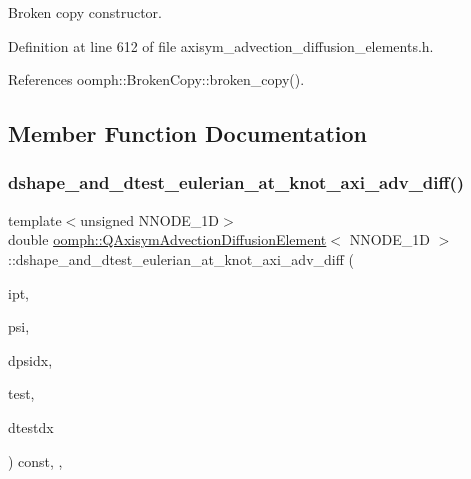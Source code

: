 Broken copy constructor. 



Definition at line 612 of file axisym\+\_\+advection\+\_\+diffusion\+\_\+elements.\+h.



References oomph\+::\+Broken\+Copy\+::broken\+\_\+copy().



\subsection{Member Function Documentation}
\mbox{\label{classoomph_1_1QAxisymAdvectionDiffusionElement_a4bb026009c2c69e6870ff45450382418}} 
\subsubsection{\texorpdfstring{dshape\+\_\+and\+\_\+dtest\+\_\+eulerian\+\_\+at\+\_\+knot\+\_\+axi\+\_\+adv\+\_\+diff()}{dshape\_and\_dtest\_eulerian\_at\_knot\_axi\_adv\_diff()}}
{\footnotesize\ttfamily template$<$unsigned N\+N\+O\+D\+E\+\_\+1D$>$ \\
double \hyperlink{classoomph_1_1QAxisymAdvectionDiffusionElement}{oomph\+::\+Q\+Axisym\+Advection\+Diffusion\+Element}$<$ N\+N\+O\+D\+E\+\_\+1D $>$\+::dshape\+\_\+and\+\_\+dtest\+\_\+eulerian\+\_\+at\+\_\+knot\+\_\+axi\+\_\+adv\+\_\+diff (\begin{DoxyParamCaption}\item[{const unsigned \&}]{ipt,  }\item[{\hyperlink{classoomph_1_1Shape}{Shape} \&}]{psi,  }\item[{\hyperlink{classoomph_1_1DShape}{D\+Shape} \&}]{dpsidx,  }\item[{\hyperlink{classoomph_1_1Shape}{Shape} \&}]{test,  }\item[{\hyperlink{classoomph_1_1DShape}{D\+Shape} \&}]{dtestdx }\end{DoxyParamCaption}) const\hspace{0.3cm}{\ttfamily [inline]}, {\ttfamily [protected]}, {\ttfamily [virtual]}}



